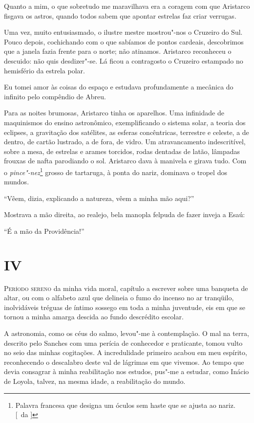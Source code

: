 Quanto a mim, o que sobretudo me maravilhava era a coragem com que Aristarco 
fisgava os astros, quando todos sabem que apontar estrelas faz criar verrugas.
 
Uma vez, muito entusiasmado, o ilustre mestre mostrou"-nos o Cruzeiro do Sul.
Pouco depois, cochichando com o que sabíamos de pontos cardeais,
descobrimos que a janela fazia frente para o norte; não atinamos.
Aristarco reconheceu o descuido: não quis desdizer"-se. Lá ficou a
contragosto o Cruzeiro estampado no hemisfério da estrela polar. 

Eu tomei amor às coisas do espaço e estudava profundamente a mecânica do
infinito pelo compêndio de Abreu. 

Para as noites brumosas, Aristarco tinha os aparelhos. Uma infinidade de
maquinismos do ensino astronômico, exemplificando o sistema solar, a teoria dos
eclipses, a gravitação dos satélites, as esferas concêntricas, terrestre e
celeste, a de dentro, de cartão lustrado, a de fora, de vidro. Um atravancamento
indescritível, sobre a mesa, de estrelas e arames torcidos, rodas dentadas de
latão, lâmpadas frouxas de nafta parodiando o sol.  Aristarco dava à manivela e
girava tudo. Com o \textit{pince"-nez}\footnote{ Palavra francesa que designa um
óculos sem haste que se ajusta ao nariz. [~da ]} grosso de tartaruga, à
ponta do nariz, dominava o tropel dos mundos. 

``Vêem, dizia, explicando a natureza, vêem a minha mão aqui?'' 

Mostrava a mão direita, ao realejo, bela manopla felpuda de fazer inveja a Esaú: 

``É a mão da Providência!''

\section{IV}

\noindent\textsc{Período sereno} da minha vida moral, capítulo a escrever sobre uma
banqueta de altar, ou com o alfabeto azul que delineia o fumo do
incenso no ar tranqüilo, inolvidáveis tréguas de íntimo sossego em toda
a minha juventude, eis em que se tornou a minha amarga descida ao fundo
descrédito escolar. 

A astronomia, como os céus do salmo, levou"-me à
contemplação. O mal na terra, descrito pelo Sanches com uma perícia de
conhecedor e praticante, tomou vulto no seio das minhas cogitações. A
incredulidade primeiro acabou em meu espírito, reconhecendo o
descalabro deste val de lágrimas em que vivemos. Ao tempo que devia
consagrar à minha reabilitação nos estudos, pus"-me a estudar, como
Inácio de Loyola, talvez, na mesma idade, a reabilitação do mundo.

